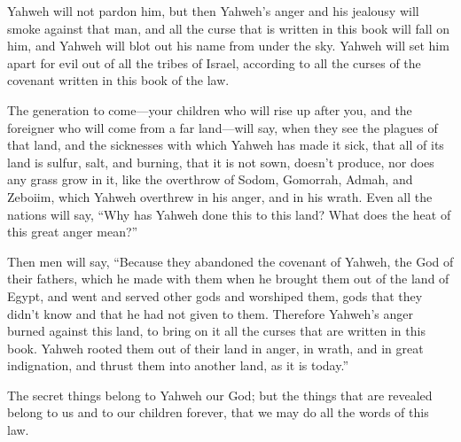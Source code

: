 {Yahweh will not pardon him, but then Yahweh’s anger and his jealousy will smoke against that man, and all the curse that is written in this book will fall on him, and Yahweh will blot out his name from under the sky.
Yahweh will set him apart for evil out of all the tribes of Israel, according to all the curses of the covenant written in this book of the law.
\par }{\PP {}The generation to come—your children who will rise up after you, and the foreigner who will come from a far land—will say, when they see the plagues of that land, and the sicknesses with which Yahweh has made it sick,
that all of its land is sulfur, salt, and burning, that it is not sown, doesn’t produce, nor does any grass grow in it, like the overthrow of Sodom, Gomorrah, Admah, and Zeboiim, which Yahweh overthrew in his anger, and in his wrath.
Even all the nations will say, “Why has Yahweh done this to this land? What does the heat of this great anger mean?”
\par }{\PP {}Then men will say, “Because they abandoned the covenant of Yahweh, the God of their fathers, which he made with them when he brought them out of the land of Egypt,
and went and served other gods and worshiped them, gods that they didn’t know and that he had not given to them.
Therefore Yahweh’s anger burned against this land, to bring on it all the curses that are written in this book.
Yahweh rooted them out of their land in anger, in wrath, and in great indignation, and thrust them into another land, as it is today.”
\par }{\PP {}The secret things belong to Yahweh our God; but the things that are revealed belong to us and to our children forever, that we may do all the words of this law.

}

